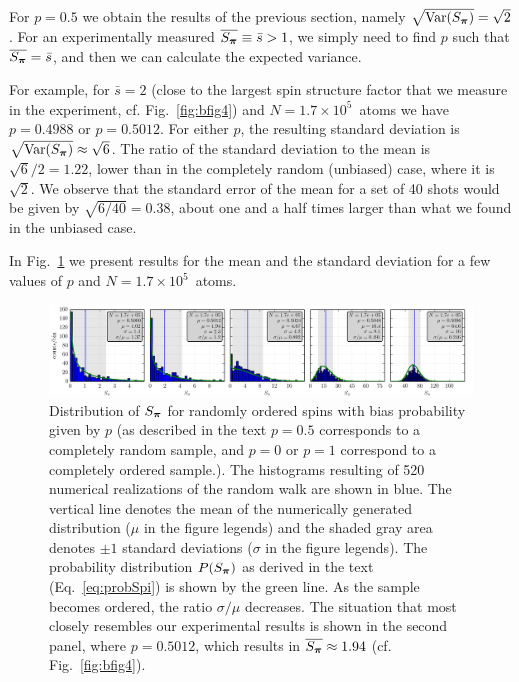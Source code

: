 For $p=0.5$ we obtain the results of the previous section, namely
$\sqrt{\text{Var}(S_{\bm{\pi}})}=\sqrt{2}$.  For an experimentally measured
$\overline{S_{\bm{\pi}}}\equiv \bar{s} > 1$, we simply need to find $p$ such
that $\overline{S_{\bm{\pi}}} = \bar{s}$,  and then we can calculate
the expected variance.   

For example,  for $\bar{s}=2$ (close to the largest spin structure factor that
we measure in the experiment, cf. Fig.~\ref{fig:bfig4}) and
$N=1.7\times10^{5}$~atoms  we have $p=0.4988$ or $p=0.5012$.   For either $p$,
the resulting standard deviation is
$\sqrt{\text{Var}(S_{\bm{\pi}})}\approx\sqrt{6}$.  The ratio of the standard
deviation to the mean is $\sqrt{6}/2=1.22$, lower than in the completely random
(unbiased) case, where it is $\sqrt{2}$.  We observe that the standard error of
the mean for a set of 40 shots would be given by  $\sqrt{6/40} = 0.38$,  about
one and a half times larger than what we found in the unbiased case.

In Fig.~\ref{fig:spi-noise} we present results for the mean and the standard
deviation for a few values of $p$ and $N =1.7\times10^{5}$~atoms.

\begin{figure}
\centering
\includegraphics[width=\textwidth]{../figures/braggscatt/Noise_hist.png}
\caption[Fluctuations in $S_{\bv{\pi}}$]{\small Distribution of $S_{\bv{\pi}}$
for randomly ordered spins with bias probability given by $p$ (as described in
the text $p=0.5$ corresponds to a completely random sample, and $p=0$ or $p=1$
correspond to a completely ordered sample.).   The histograms resulting of 520
numerical realizations of the random walk are shown in blue.  The vertical line
denotes the mean of the numerically generated distribution ($\mu$ in the figure
legends) and the shaded gray area denotes $\pm1$ standard deviations ($\sigma$
in the figure legends). The probability distribution $P(S_{\bm{\pi}})$ as
derived in the text (Eq.~\ref{eq:probSpi}) is shown by the green line.  As the
sample becomes ordered, the ratio $\sigma/\mu$ decreases.  The situation that
most closely resembles our experimental results is shown in the second panel,
where $p=0.5012$, which results in $\overline{S_{\bm{\pi}}}\approx 1.94$ (cf.
Fig.~\ref{fig:bfig4}).}
\label{fig:spi-noise}
\end{figure}

